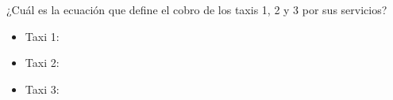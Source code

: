 ¿Cuál es la ecuación que define el cobro de los taxis 1, 2 y 3 por sus servicios?

\begin{itemize}
    \item Taxi 1: \fillin[$y = 2.667x + 40$][3cm]
    \item Taxi 2: \fillin[$y = 4x$][3cm]
    \item Taxi 3: \fillin[$y = 2x + 20$][3cm]
\end{itemize}